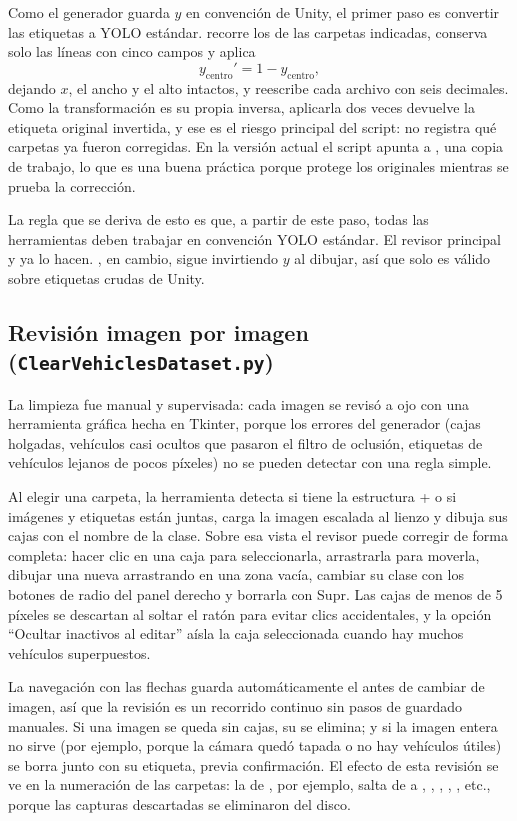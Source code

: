 \documentclass[11pt,a4paper]{article}
\begin{document}
Como el generador guarda $y$ en convención de Unity, el primer paso es convertir las etiquetas a YOLO estándar.  recorre los  de las carpetas indicadas, conserva solo las líneas con cinco campos y aplica
\[
y_{\text{centro}}' = 1 - y_{\text{centro}},
\]
dejando $x$, el ancho y el alto intactos, y reescribe cada archivo con seis decimales. Como la transformación es su propia inversa, aplicarla dos veces devuelve la etiqueta original invertida, y ese es el riesgo principal del script: no registra qué carpetas ya fueron corregidas. En la versión actual el script apunta a , una copia de trabajo, lo que es una buena práctica porque protege los originales mientras se prueba la corrección.

La regla que se deriva de esto es que, a partir de este paso, todas las herramientas deben trabajar en convención YOLO estándar. El revisor principal y  ya lo hacen. , en cambio, sigue invirtiendo $y$ al dibujar, así que solo es válido sobre etiquetas crudas de Unity.

\subsection{Revisión imagen por imagen (\texorpdfstring{\texttt{ClearVehiclesDataset.py}}{ClearVehiclesDataset.py})}

La limpieza fue manual y supervisada: cada imagen se revisó a ojo con una herramienta gráfica hecha en Tkinter, porque los errores del generador (cajas holgadas, vehículos casi ocultos que pasaron el filtro de oclusión, etiquetas de vehículos lejanos de pocos píxeles) no se pueden detectar con una regla simple.

Al elegir una carpeta, la herramienta detecta si tiene la estructura  +  o si imágenes y etiquetas están juntas, carga la imagen escalada al lienzo y dibuja sus cajas con el nombre de la clase. Sobre esa vista el revisor puede corregir de forma completa: hacer clic en una caja para seleccionarla, arrastrarla para moverla, dibujar una nueva arrastrando en una zona vacía, cambiar su clase con los botones de radio del panel derecho y borrarla con Supr. Las cajas de menos de 5 píxeles se descartan al soltar el ratón para evitar clics accidentales, y la opción ``Ocultar inactivos al editar'' aísla la caja seleccionada cuando hay muchos vehículos superpuestos.

La navegación con las flechas guarda automáticamente el  antes de cambiar de imagen, así que la revisión es un recorrido continuo sin pasos de guardado manuales. Si una imagen se queda sin cajas, su  se elimina; y si la imagen entera no sirve (por ejemplo, porque la cámara quedó tapada o no hay vehículos útiles) se borra junto con su etiqueta, previa confirmación. El efecto de esta revisión se ve en la numeración de las carpetas: la de , por ejemplo, salta de  a , , , , , etc., porque las capturas descartadas se eliminaron del disco.
\end{document}
